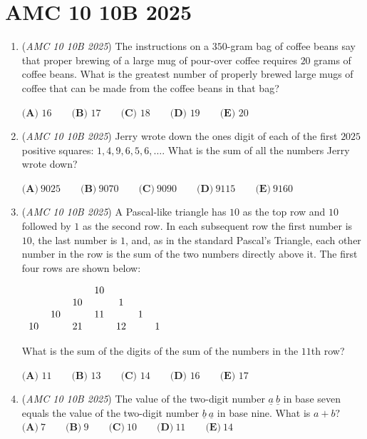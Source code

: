 \section{AMC 10 10B 2025}
        \begin{enumerate}
        	\item (\textit{AMC 10 10B 2025}) The instructions on a $350$-gram bag of coffee beans say that proper brewing of a large mug of pour-over coffee requires $20$ grams of coffee beans. What is the greatest number of properly brewed large mugs of coffee that can be made from the coffee beans in that bag?


 $\textbf{(A) } 16 \qquad\textbf{(B) } 17 \qquad\textbf{(C) } 18 \qquad\textbf{(D) } 19 \qquad\textbf{(E) } 20$


	\item (\textit{AMC 10 10B 2025}) Jerry wrote down the ones digit of each of the first $2025$ positive squares: $1,4,9,6,5,6,\dots$. What is the sum of all the numbers Jerry wrote down?


 $\textbf{(A)}~9025 \qquad \textbf{(B)}~9070 \qquad \textbf{(C)}~9090 \qquad \textbf{(D)}~9115 \qquad \textbf{(E)}~9160$


	\item (\textit{AMC 10 10B 2025}) A Pascal-like triangle has $10$ as the top row and $10$ followed by $1$ as the second row. In each subsequent row the first number is $10$, the last number is $1$, and, as in the standard Pascal's Triangle, each other number in the row is the sum of the two numbers directly above it. The first four rows are shown below:


 $\begin{tabular}{ccccccc} &&&10&&&\\ &&10&&1&& \\ &10&&11&&1& \\ 10&&21&&12&&1 \\ \end{tabular}$


 What is the sum of the digits of the sum of the numbers in the $11$th row? 


 $\textbf{(A) } 11 \qquad\textbf{(B) } 13 \qquad\textbf{(C) } 14 \qquad\textbf{(D) } 16 \qquad\textbf{(E) } 17$


	\item (\textit{AMC 10 10B 2025}) The value of the two-digit number $\underline{a}~\underline{b}$ in base seven equals the value of the two-digit number $\underline{b}~\underline{a}$ in base nine. What is $a+b?$
$\textbf{(A)}~7\qquad\textbf{(B)}~9\qquad\textbf{(C)}~10\qquad\textbf{(D)}~11\qquad\textbf{(E)}~14$



\end{enumerate}
